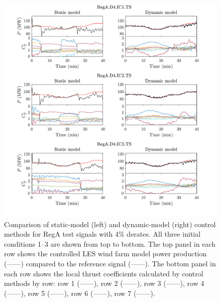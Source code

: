 \begin{figure}[h!]
\begin{center}
\includegraphics[width=\textwidth]{./fig/f5.pdf}
\end{center}
\caption{\label{fig:reg_a_4d} Comparison of static-model (left) and dynamic-model (right) control methods for RegA test signals with 4\% derates. All three initial conditions 1--3 are shown from top to bottom. The top panel in each row shows the controlled LES wind farm model power production (------) compared to the reference signal ({\color{red}------}). The bottom panel in each row shows the local thrust coefficients calculated by control methods by row: row  1 ({\color{co1}------}), row  2 ({\color{co2}------}), row  3 ({\color{co3}------}), row  4 ({\color{co4}------}), row  5 ({\color{co5}------}), row  6 ({\color{co6}------}), row  7 ({\color{co7}------}).}
\end{figure}

